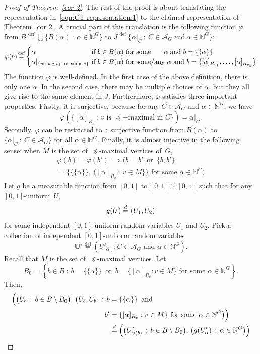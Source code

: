 \documentclass[AHL,Unicode,longabstracts,published]{cedram}
\newcommand*{\defeq}{\stackrel{\mathrm{def}}{=}}
\renewcommand{\d}{\buildrel{d}\over{=}}
\newcommand*\N{\mathbb{N}}
\renewcommand{\AA}{\mathcal{A}}
\newcommand*\bU{\mathbf{U}}
\newcommand*\N{\mathbb{N}}
\begin{document}
\begin{proof}[Proof of Theorem~\ref{cor 2}]
The rest of the proof is about translating the representation in~\eqref{eqn:CT-representation:1} to the claimed representation of Theorem~\ref{cor 2}. A crucial part of this translation is the following function $\varphi$ from $B
\defeq \bigcup \{ B(\alpha)~:~\alpha \in \N^G\}$ to $J
\defeq \{\alpha|_C~:~C \in \AA_G \ \mbox{and}\ \alpha \in \N^G\}$:
\[
\varphi(b)\!
\defeq\!
\begin{cases}
\alpha & \!\!\!\!\text{if }b \in B(\alpha)\text{ for some}\mkern35mu\alpha\;\text{and }b = \{\{\alpha\}\}
\\
\alpha|_{\{w\,:\,w \preceq v_i \text{ for some }i \}} & \!\!\!\!\text{if } b \in B(\alpha) \text{ for some/any }\alpha \text{ and }b = 
\{[\alpha]_{R_{v_1}},\ldots,[\alpha]_{R_{v_k}}\}
\end{cases}
\]
The function $\varphi$ is well-defined. In the first case of the above definition, there is only one $\alpha$. In the second case, there may be multiple choices of $\alpha$, but they all give rise to the same element in $J$. Furthermore, $\varphi$ satisfies three important properties. Firstly, it is surjective, because for any $C \in \AA_G$ and $\alpha \in \N^G$, we have
\[
\varphi(\{[\alpha]_{R_v}~:~v \text{ is }\preceq-\text{maximal in }C\}) = \alpha|_C.
\]
\goodbreak
Secondly, $\varphi$ can be restricted to a surjective function from $B(\alpha)$
to $\{\alpha|_C~:~C \in \AA_G\}$ for all $\alpha \in \N^G$. Finally, it is almost injective in the following sense: when $M$ is the set of $\preceq$-maximal vertices
of~$G$,
\begin{multline*}
\varphi(b) = \varphi(b') \implies
\Big(b = b' \, \text{ or }\,
\big\{b,b'\big\}\\
= \big\{\{\{\alpha\}\},\,\{[\alpha]_{R_v}~:~v \in M\}\big\}\text{ for some }\alpha \in \N^G\Big)
\end{multline*}
Let $g$ be a measurable function from $[0,1]$ to $[0,1] \times [0,1]$ such that for any $[0,1]$-uniform~$U$,
\[
g(U) \d (U_1,U_2)
\]
for some independent $[0,1]$-uniform random variables $U_1$ and $U_2$. Pick a collection of independent $[0,1]$-uniform
random variables
\[
\bU'
\defeq \left(U'_{\alpha|_C} : C \in \AA_G\text{ and }\alpha \in \N^G\right).
\]
Recall that $M$ is the set of $\preceq$-maximal vertices. Let
\[
B_0 = \left\{b \in B~:~b = \{\{\alpha\}\}\, \text{ or }\, b = \{[\alpha]_{R_v} : v \in M\} \text{ for some }
\alpha \in \N^G\right\}.
\]
Then,
\begin{align*}
\Big(\big(U_b\,:\,b \in B \setminus B_0\big),\,
\big(U_b, U_{b'}\,:\,
b &= \{\{\alpha\}\} \,\text{ and }\,
\\ b' &= \{[\alpha]_{R_v} : v \in M\} \text{ for some } \alpha \in \N^G\big)\Big)
\\
&\d \Big(\big(U'_{\varphi(b)}\,:\,b \in B \setminus B_0\big),\,
\big(g(U'_\alpha)\,:\,\alpha \in \N^G\big)\Big)
\end{align*}


\end{proof}
\end{document}
